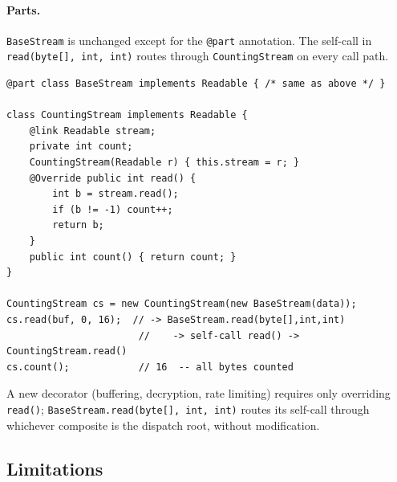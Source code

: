 \documentclass[acmsmall,nonacm]{acmart}
\theoremstyle{acmplain}
\theoremstyle{acmdefinition}
\newcommand{\code}[1]{\texttt{#1}}
\begin{document}
\paragraph{Parts.}
\code{BaseStream} is unchanged except for the \code{@part} annotation. The
self-call in \code{read(byte[], int, int)} routes through \code{CountingStream}
on every call path.

\begin{lstlisting}
@part class BaseStream implements Readable { /* same as above */ }

class CountingStream implements Readable {
    @link Readable stream;
    private int count;
    CountingStream(Readable r) { this.stream = r; }
    @Override public int read() {
        int b = stream.read();
        if (b != -1) count++;
        return b;
    }
    public int count() { return count; }
}

CountingStream cs = new CountingStream(new BaseStream(data));
cs.read(buf, 0, 16);  // -> BaseStream.read(byte[],int,int)
                       //    -> self-call read() -> CountingStream.read()
cs.count();            // 16  -- all bytes counted
\end{lstlisting}

A new decorator (buffering, decryption, rate limiting) requires only
overriding \code{read()}; \code{BaseStream.read(byte[], int, int)} routes its
self-call through whichever composite is the dispatch root, without
modification.

\subsection{Limitations}\label{sec:limitations}
\end{document}
